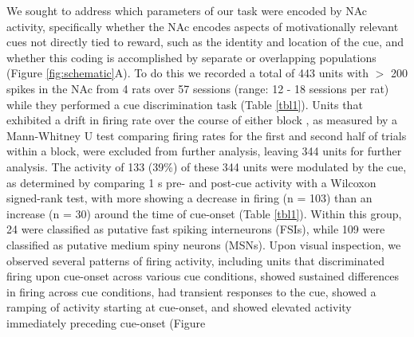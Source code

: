 \documentclass[11pt]{article}
\providecommand{\DIFadd}[1]{{\protect\color{red} \sf #1}} %
\providecommand{\DIFdel}[1]{} %
\providecommand{\DIFaddbegin}{} %
\providecommand{\DIFaddend}{} %
\providecommand{\DIFdelbegin}{} %
\providecommand{\DIFdelend}{} %
\newcommand{\DIFscaledelfig}{0.5}
\newlength{\DIFdelgraphicswidth} %
\newlength{\DIFdelgraphicsheight} %
\newcommand{\DIFaddincludegraphics}[2][]{{\color{red}\fbox{\DIFOincludegraphics[#1]{#2}}}} %
\newcommand{\DIFdelincludegraphics}[2][]{%
\sbox{\DIFdelgraphicsbox}{\DIFOincludegraphics[#1]{#2}}%
\settoboxwidth{\DIFdelgraphicswidth}{\DIFdelgraphicsbox} %
\settoboxtotalheight{\DIFdelgraphicsheight}{\DIFdelgraphicsbox} %
\scalebox{\DIFscaledelfig}{%
\parbox[b]{\DIFdelgraphicswidth}{\usebox{\DIFdelgraphicsbox}\\[-\baselineskip] \rule{\DIFdelgraphicswidth}{0em}}\llap{\resizebox{\DIFdelgraphicswidth}{\DIFdelgraphicsheight}{%
\setlength{\unitlength}{\DIFdelgraphicswidth}%
\begin{picture}(1,1)%
\thicklines\linethickness{2pt} %
{\color[rgb]{1,0,0}\put(0,0){\framebox(1,1){}}}%
{\color[rgb]{1,0,0}\put(0,0){\line( 1,1){1}}}%
{\color[rgb]{1,0,0}\put(0,1){\line(1,-1){1}}}%
\end{picture}%
}\hspace*{3pt}}} %
} %
\DeclareRobustCommand{\DIFaddbegin}{\DIFOaddbegin \let\includegraphics\DIFaddincludegraphics} %
\DeclareRobustCommand{\DIFaddend}{\DIFOaddend \let\includegraphics\DIFOincludegraphics} %
\DeclareRobustCommand{\DIFdelbegin}{\DIFOdelbegin \let\includegraphics\DIFdelincludegraphics} %
\DeclareRobustCommand{\DIFdelend}{\DIFOaddend \let\includegraphics\DIFOincludegraphics} %
\begin{document}
\DIFdelend We sought to address which parameters of our task were encoded by NAc
activity, specifically whether the NAc encodes aspects of
motivationally relevant cues not directly tied to reward, such as the
identity and location of the cue, and whether this coding is
\DIFdelbegin \DIFdel{independent or integrated with coding of cue outcome}\DIFdelend \DIFaddbegin \DIFadd{accomplished by separate or overlapping populations (Figure
\ref{fig:schematic}A)}\DIFaddend . To do this we recorded a total of 443 units
with $>$ 200 spikes in the NAc from 4 rats over 57 sessions (range: 12
- 18 sessions per rat) while they performed a cue discrimination task
(Table \ref{tbl1}). Units that exhibited a drift in firing rate over
the course of either block\DIFaddbegin \DIFadd{, as measured by a Mann-Whitney U test comparing
firing rates for the first and second half of trials within a block,
}\DIFaddend were excluded from further analysis, leaving 344 units for further
analysis. The activity of 133 (39\%) of these 344 units were modulated
by the cue, \DIFdelbegin \DIFdel{with }\DIFdelend \DIFaddbegin \DIFadd{as determined by comparing 1 s pre- and post-cue activity with a Wilcoxon signed-rank test, with }\DIFaddend more showing a decrease in firing (n = 103) than an
increase (n = 30) around the time of cue-onset (Table
\ref{tbl1}). Within this group, 24 were classified as \DIFdelbegin \DIFdel{FSIs}\DIFdelend \DIFaddbegin \DIFadd{putative fast spiking interneurons (FSIs)}\DIFaddend , while 109
were classified as \DIFdelbegin \DIFdel{SPNs}\DIFdelend \DIFaddbegin \DIFadd{putative medium spiny neurons (MSNs)}\DIFaddend . Upon visual inspection, we observed several
patterns of firing activity, including units that discriminated firing
upon cue-onset across various cue conditions, showed sustained
differences in firing across cue conditions, had transient responses
to the cue, showed a ramping of activity starting at cue-onset, and
showed elevated activity immediately preceding cue-onset \DIFdelbegin \DIFdel{, for example }\DIFdelend (Figure
\end{document}
